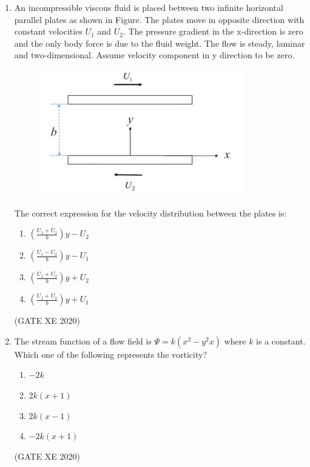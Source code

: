 \documentclass[12pt]{article}
\begin{document}
\begin{enumerate}
\begin{enumerate}
\item $5\hat{i} + 2(x+z)\hat{j} + 2(t+y)\hat{k}$
\item $5\hat{i} + t(10z+4xy)\hat{j} + (2y+4xzt)\hat{k}$
\item $5\hat{i} + 2y\hat{k}$
\item $2t(2xy+5z)\hat{j} + 4xzt \hat{k}$
\end{enumerate}
(GATE XE 2020)

\item An incompressible viscous fluid is placed between two infinite horizontal parallel plates as shown in Figure. The plates move in opposite direction with constant velocities $U_1$ and $U_2$. The pressure gradient in the x-direction is zero and the only body force is due to the fluid weight. The flow is steady, laminar and two-dimensional. Assume velocity component in y direction to be zero.

\begin{figure}[H]
    \centering
    \includegraphics[width=0.5\columnwidth]{figs/ass4_b_q12.png}
    \caption{}
    \label{fig:placeholder}
\end{figure}

The correct expression for the velocity distribution between the plates is:

\begin{enumerate}
\item $\left (\frac{U_1 + U_2}{b}\right) y - U_2$
\item $\left (\frac{U_1 - U_2}{b}\right) y - U_1$
\item $\left (\frac{U_1 + U_2}{b}\right) y + U_2$
\item $\left (\frac{U_1 + U_2}{b}\right) y + U_1$
\end{enumerate}
(GATE XE 2020)

\item The stream function of a flow field is $\Psi = k(x^2 - y^2 x)$ where $k$ is a constant.  
Which one of the following represents the vorticity?

\begin{enumerate}
\item $-2k$
\item $2k(x+1)$
\item $2k(x-1)$
\item $-2k(x+1)$
\end{enumerate}
(GATE XE 2020)


\end{enumerate}
\end{document}
